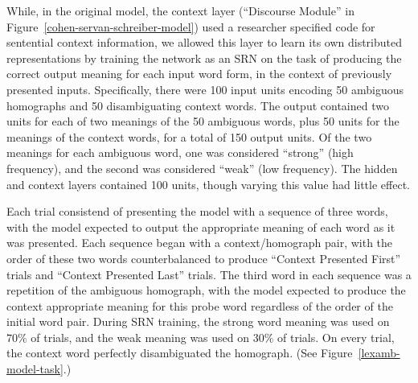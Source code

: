While, in the original model, the context layer (``Discourse Module'' in Figure~\ref{cohen-servan-schreiber-model}) used a researcher specified code for sentential context information, we allowed this layer to learn its own distributed representations by training the network as an SRN on the task of producing the correct output meaning for each input word form, in the context of previously presented inputs. Specifically, there were 100 input units encoding 50 ambiguous homographs and 50 disambiguating context words. The output contained two units for each of two meanings of the 50 ambiguous words, plus 50 units for the meanings of the context words, for a total of 150 output units. Of the two meanings for each ambiguous word, one was considered ``strong'' (high frequency), and the second was considered ``weak'' (low frequency). The hidden and context layers contained 100 units, though varying this value had little effect.

Each trial consistend of presenting the model with a sequence of three words, with the model expected to output the appropriate meaning of each word as it was presented. Each sequence began with a context/homograph pair, with the order of these two words counterbalanced to produce ``Context Presented First'' trials and ``Context Presented Last'' trials. The third word in each sequence was a repetition of the ambiguous homograph, with the model expected to produce the context appropriate meaning for this probe word regardless of the order of the initial word pair. During SRN training, the strong word meaning was used on $70\%$ of trials, and the weak meaning was used on $30\%$ of trials. On every trial, the context word perfectly disambiguated the homograph. (See Figure~\ref{lexamb-model-task}.) 


